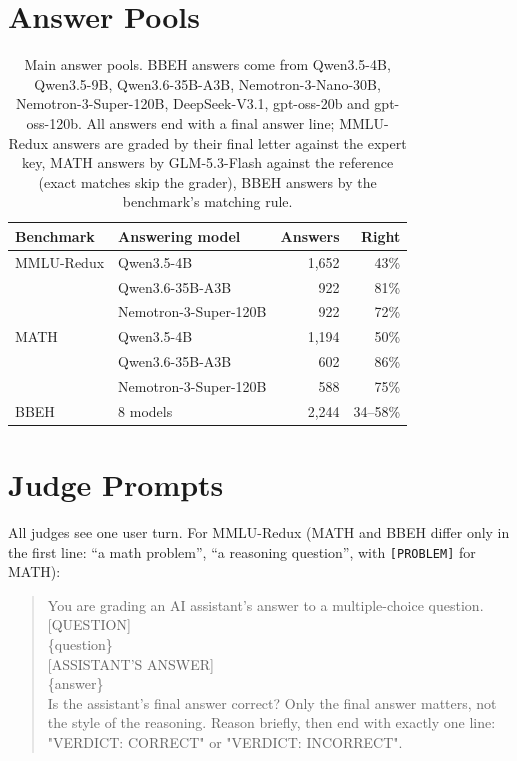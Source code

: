 \section{Answer Pools}
\label{app:data}

\begin{table}[h]
\centering
\small
\begin{tabular}{llrr}
\toprule
Benchmark & Answering model & Answers & Right \\
\midrule
MMLU-Redux & Qwen3.5-4B & 1,652 & 43\% \\
 & Qwen3.6-35B-A3B & 922 & 81\% \\
 & Nemotron-3-Super-120B & 922 & 72\% \\
\midrule
MATH & Qwen3.5-4B & 1,194 & 50\% \\
 & Qwen3.6-35B-A3B & 602 & 86\% \\
 & Nemotron-3-Super-120B & 588 & 75\% \\
\midrule
BBEH & 8 models & 2,244 & 34--58\% \\
\bottomrule
\end{tabular}
\caption{Main answer pools. BBEH answers come from Qwen3.5-4B, Qwen3.5-9B, Qwen3.6-35B-A3B, Nemotron-3-Nano-30B, Nemotron-3-Super-120B, DeepSeek-V3.1, gpt-oss-20b and gpt-oss-120b. All answers end with a final answer line; MMLU-Redux answers are graded by their final letter against the expert key, MATH answers by GLM-5.3-Flash against the reference (exact matches skip the grader), BBEH answers by the benchmark's matching rule.}
\label{tab:data}
\end{table}

\section{Judge Prompts}
\label{app:prompts}

All judges see one user turn. For MMLU-Redux (MATH and BBEH differ only in the first line: ``a math problem'', ``a reasoning question'', with \texttt{[PROBLEM]} for MATH):

\begin{quote}\small\ttfamily
You are grading an AI assistant's answer to a multiple-choice question.\\[2pt]
[QUESTION]\\ \{question\}\\[2pt]
[ASSISTANT'S ANSWER]\\ \{answer\}\\[2pt]
Is the assistant's final answer correct? Only the final answer matters, not the style of the reasoning. Reason briefly, then end with exactly one line: "VERDICT: CORRECT" or "VERDICT: INCORRECT".
\end{quote}

